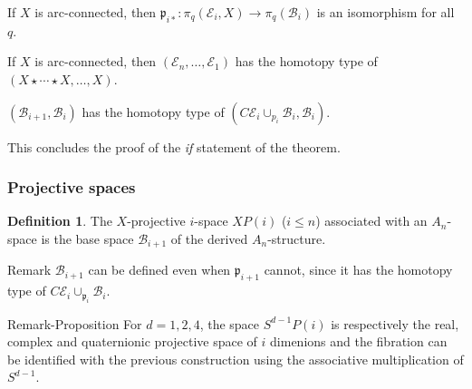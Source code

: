 \documentclass{beamer}
\theoremstyle{definition}
\newtheorem{defi}{Definition}
\begin{document}
\begin{frame}
\begin{theorem}
If $X$ is arc-connected, then $\mathfrak{p}_{i*}:\pi_q(\mathcal{E}_i,X)\to \pi_q(\mathcal{B}_i)$ is an isomorphism for all $q$. %
\end{theorem}\pause

\begin{theorem}
If $X$ is arc-connected, then $(\mathcal{E}_n, \dots, \mathcal{E}_1)$ has the homotopy type of $(X\star\cdots\star X,\dots, X)$. %
\end{theorem}\pause

\begin{theorem}
$(\mathcal{B}_{i+1},\mathcal{B}_i)$ has the homotopy type of $(C\mathcal{E}_i\cup_{p_i}\mathcal{B}_i,\mathcal{B}_i)$. %
\end{theorem}\pause
This concludes the proof of the \emph{if} statement of the theorem.
\end{frame}
\begin{frame}
\frametitle{Projective spaces}
\begin{defi}
The $X$-projective $i$-space $XP(i)$ ($i\leq n$) associated with an $A_n$-space is the base space $\mathcal{B}_{i+1}$ of the derived $A_n$-structure.
\end{defi}\pause
\begin{block}{Remark}
$\mathcal{B}_{i+1}$ can be defined even when $\mathfrak{p}_{i+1}$ cannot, since it has the homotopy type of $C\mathcal{E}_i\cup_{\mathfrak{p}_i}\mathcal{B}_i$.
\end{block}\pause
\begin{block}{Remark-Proposition}%
For $d=1,2,4$, the space $S^{d-1}P(i)$ is respectively the real, complex and quaternionic projective space of $i$ dimenions and the fibration can be identified with the previous construction using the associative multiplication of $S^{d-1}$.
\end{block}
\end{frame}
\end{document}
